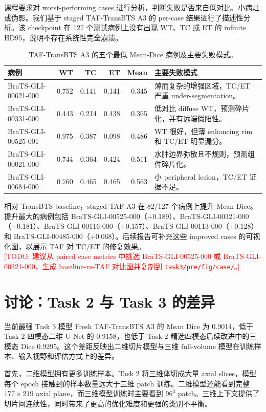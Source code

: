 \documentclass[UTF8,11pt]{ctexart}
\newcommand{\todo}[1]{\textcolor{red}{[TODO: #1]}}
\begin{document}
课程要求对 worst-performing cases 进行分析，判断失败是否来自低对比、小病灶或伪影。我们基于 staged TAF-TransBTS A3 的 per-case 结果进行了描述性分析。该 checkpoint 在 127 个测试病例上没有出现 WT、TC 或 ET 的 infinite HD95，说明不存在系统性完全崩溃。

\begin{table}[H]
\centering
\caption{TAF-TransBTS A3 的五个最低 Mean-Dice 病例及主要失败模式。}
\begin{tabular}{lrrrrp{6.3cm}}
\toprule
病例 & WT & TC & ET & Mean & 主要失败模式 \\
\midrule
BraTS-GLI-00621-000 & 0.752 & 0.141 & 0.141 & 0.345 & 薄而复杂的增强区域，TC/ET 严重 under-segmentation。 \\
BraTS-GLI-00331-000 & 0.443 & 0.214 & 0.438 & 0.365 & 低对比 diffuse WT，预测碎片化，并有远端假阳性。 \\
BraTS-GLI-00525-001 & 0.975 & 0.387 & 0.098 & 0.486 & WT 很好，但薄 enhancing rim 和 TC/ET 明显漏分。 \\
BraTS-GLI-00021-000 & 0.744 & 0.364 & 0.424 & 0.511 & 水肿边界弥散且不规则，预测组件碎片化。 \\
BraTS-GLI-00684-000 & 0.760 & 0.465 & 0.465 & 0.563 & 小 peripheral lesion，TC/ET 证据不足。 \\
\bottomrule
\end{tabular}
\end{table}

相对 TransBTS baseline，staged TAF A3 在 82/127 个病例上提升 Mean Dice。提升最大的病例包括 BraTS-GLI-00525-000（+0.189）、BraTS-GLI-00321-000（+0.181）、BraTS-GLI-00116-000（+0.157）、BraTS-GLI-00113-000（+0.128）和 BraTS-GLI-00485-000（+0.068）。后续报告可补充这些 improved cases 的可视化图，以展示 TAF 对 TC/ET 的修复效果。\\
\todo{建议从 paired case metrics 中挑选 BraTS-GLI-00525-000 或 BraTS-GLI-00321-000，生成 baseline-vs-TAF 对比图并复制到 \texttt{task3/pre/fig/case/}。}

\section{讨论：Task 2 与 Task 3 的差异}

当前最强 Task 3 模型 Fresh TAF-TransBTS A3 的 Mean Dice 为 0.9014，低于 Task 2 四模态二维 U-Net 的 0.9158，也低于 Task 2 精选四模态后续改进中的三模态 Dice 0.9295。这个差距反映出二维切片模型与三维 full-volume 模型在训练样本、输入视野和评估方式上的差异。

首先，二维模型拥有更多训练样本。Task 2 将三维体切成大量 axial slices，模型每个 epoch 接触到的样本数量远大于三维 patch 训练。二维模型还能看到完整 $177\times219$ axial plane，而三维模型训练时主要看到 $96^3$ patch。三维上下文提供了切片间连续性，同时带来了更高的优化难度和更强的类别不平衡。
\end{document}
